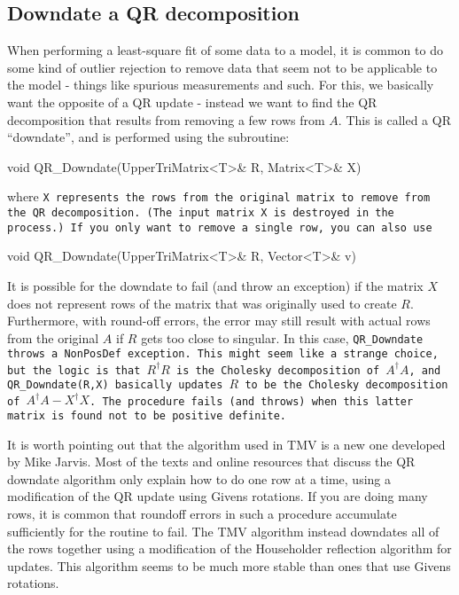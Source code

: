 \subsection{Downdate a QR decomposition}
\label{QRDowndate}

When performing a least-square fit of some data to a model,
it is common to do some kind of outlier rejection to remove data that
seem not to be applicable to the model - things like spurious measurements
and such.
For this, we basically want the opposite of a QR update - instead we want to 
find the QR decomposition that results from
removing a few rows from $A$.  This is called a QR ``downdate'', and is performed
using the subroutine:
\begin{tmvcode}
void QR_Downdate(UpperTriMatrix<T>& R, Matrix<T>& X)
\end{tmvcode}
where \tt{X} represents the rows from the original matrix to remove from the 
QR decomposition.  (The input matrix \tt{X} is destroyed in the process.)  If you only want to
remove a single row, you can also use
\begin{tmvcode}
void QR_Downdate(UpperTriMatrix<T>& R, Vector<T>& v)
\end{tmvcode}

It is possible for the downdate to fail (and throw an exception) 
if the matrix $X$ does not represent rows
of the matrix that was originally used to create $R$.
Furthermore,
with round-off errors, the error may still result with actual rows from the 
original $A$
if $R$ gets too close to singular.  In this case, \tt{QR\_Downdate} throws
a \tt{NonPosDef} exception.  This might seem like a strange choice, but the 
logic is that $R^\dagger R$ is the Cholesky decomposition of $A^\dagger A$,
and \tt{QR\_Downdate(R,X)} basically updates $R$ to be the Cholesky decomposition
of $A^\dagger A - X^\dagger X$.  The procedure fails (and throws) when this latter 
matrix is found not to be positive definite.

It is worth pointing out that the algorithm used in TMV is a new one developed by
Mike Jarvis.  Most of the texts and online resources that discuss the 
QR downdate algorithm only explain how to do one row at a time, using a 
modification of the QR update using Givens rotations.  
If you are doing many rows, it is common that roundoff errors in such a 
procedure accumulate sufficiently for the routine to fail.  The TMV algorithm
instead downdates all of the rows together using a modification of the 
Householder reflection algorithm for updates.  This algorithm seems to be
much more stable than ones that use Givens rotations.  

